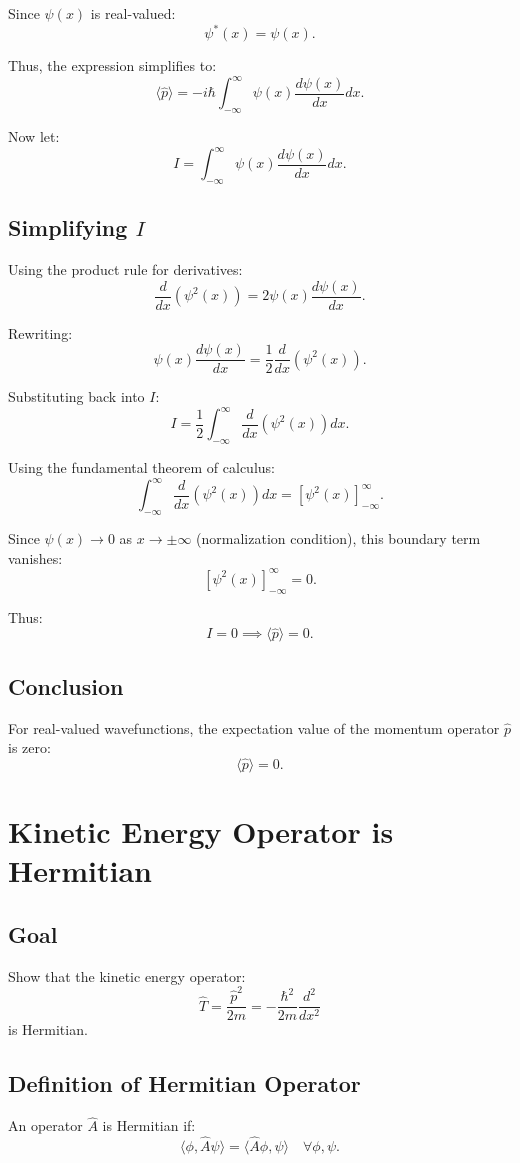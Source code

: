 \documentclass[a4paper,12pt]{article}
\begin{document}
Since $\psi(x)$ is real-valued:
\[
\psi^*(x) = \psi(x).
\]

Thus, the expression simplifies to:
\[
\langle \hat{p} \rangle = -i\hbar \int_{-\infty}^\infty \psi(x) \frac{d\psi(x)}{dx} dx.
\]

Now let:
\[
I = \int_{-\infty}^\infty \psi(x) \frac{d\psi(x)}{dx} dx.
\]

\subsection*{Simplifying $I$}
Using the product rule for derivatives:
\[
\frac{d}{dx} \left(\psi^2(x)\right) = 2\psi(x) \frac{d\psi(x)}{dx}.
\]

Rewriting:
\[
\psi(x) \frac{d\psi(x)}{dx} = \frac{1}{2} \frac{d}{dx} \left(\psi^2(x)\right).
\]

Substituting back into $I$:
\[
I = \frac{1}{2} \int_{-\infty}^\infty \frac{d}{dx} \left(\psi^2(x)\right) dx.
\]

Using the fundamental theorem of calculus:
\[
\int_{-\infty}^\infty \frac{d}{dx} \left(\psi^2(x)\right) dx = \left[\psi^2(x)\right]_{-\infty}^\infty.
\]

Since $\psi(x) \to 0$ as $x \to \pm \infty$ (normalization condition), this boundary term vanishes:
\[
\left[\psi^2(x)\right]_{-\infty}^\infty = 0.
\]

Thus:
\[
I = 0 \implies \langle \hat{p} \rangle = 0.
\]

\subsection*{Conclusion}
For real-valued wavefunctions, the expectation value of the momentum operator $\hat{p}$ is zero:
\[
\boxed{\langle \hat{p} \rangle = 0.}
\]

\section*{Kinetic Energy Operator is Hermitian}

\subsection*{Goal}
Show that the kinetic energy operator:
\[
\hat{T} = \frac{\hat{p}^2}{2m} = -\frac{\hbar^2}{2m} \frac{d^2}{dx^2}
\]
is Hermitian.

\subsection*{Definition of Hermitian Operator}
An operator $\hat{A}$ is Hermitian if:
\[
\langle \phi, \hat{A} \psi \rangle = \langle \hat{A} \phi, \psi \rangle \quad \forall \phi, \psi.
\]
\end{document}
